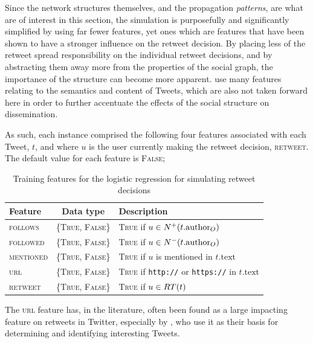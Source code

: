 Since the network structures themselves, and the propagation \textit{patterns}, are what are of interest in this section, the simulation is purposefully and significantly simplified by using far fewer features, yet ones which are features that have been shown to have a stronger influence on the retweet decision. By placing less of the retweet spread responsibility on the individual retweet decisions, and by abstracting them away more from the properties of the social graph, the importance of the structure can become more apparent. \citet{zhu11} use many features relating to the semantics and content of Tweets, which are also not taken forward here in order to further accentuate the effects of the social structure on dissemination.

As such, each instance comprised the following four features associated with each Tweet, $t$, and where $u$ is the user currently making the retweet decision, \textsc{retweet}. The default value for each feature is \textsc{False};

\begin{table}[h]\footnotesize
\begin{center}
\begin{tabular}{ l | c | l }
	Feature & Data type & Description\\
	\hline
	\hline 
	\textsc{follows}    & \{\textsc{True, False}\} & \textsc{True} if $u \in N^+(t.\textrm{author}_O)$\\
    \textsc{followed}   & \{\textsc{True, False}\} & \textsc{True} if $u \in N^-(t.\textrm{author}_O)$\\
    \textsc{mentioned}  & \{\textsc{True, False}\} & \textsc{True} if $u$ is mentioned in $t.\textrm{text}$\\
    \textsc{url}        & \{\textsc{True, False}\} & \textsc{True} if \texttt{http://} or \texttt{https://} in $t.\textrm{text}$\\
    \hline 
    \textsc{retweet}    & \{\textsc{True, False}\} & \textsc{True} if $u \in RT(t)$\\ 
    \hline
\end{tabular}
\end{center}
\caption{Training features for the logistic regression for simulating retweet decisions}
\label{table:logisticregressionfeatures}
\end{table}

The \textsc{url} feature has, in the literature, often been found as a large impacting feature on retweets in Twitter, especially by \citet{alonso10}, who use it as their basis for determining and identifying interesting Tweets.


